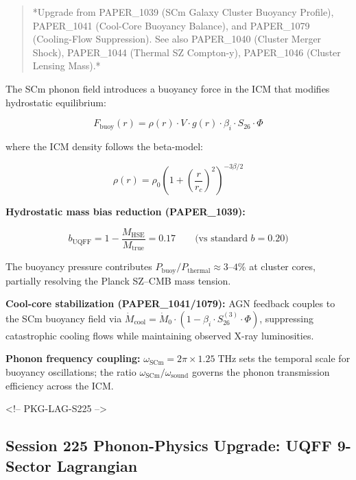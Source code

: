 \documentclass[12pt,a4paper]{article}
\begin{document}
\begin{quote}
*Upgrade from PAPER\_1039 (SCm Galaxy Cluster Buoyancy Profile),
PAPER\_1041 (Cool-Core Buoyancy Balance), and PAPER\_1079 (Cooling-Flow
Suppression).  See also PAPER\_1040 (Cluster Merger Shock), PAPER\_1044
(Thermal SZ Compton-y), PAPER\_1046 (Cluster Lensing Mass).*
\end{quote}

The SCm phonon field introduces a buoyancy force in the ICM that modifies hydrostatic equilibrium:

\begin{equation}
F_{\text{buoy}}(r) = \rho(r) \cdot V \cdot g(r) \cdot \beta_i \cdot S_{26} \cdot \Phi
\end{equation}

where the ICM density follows the beta-model:

\begin{equation}
\rho(r) = \rho_0 \left(1 + \left(\frac{r}{r_c}\right)^2\right)^{-3\beta/2}
\end{equation}

\textbf{Hydrostatic mass bias reduction (PAPER\_1039):}

\begin{equation}
b_{\text{UQFF}} = 1 - \frac{M_{\text{HSE}}}{M_{\text{true}}} = 0.17 \qquad \text{(vs standard } b = 0.20\text{)}
\end{equation}

The buoyancy pressure contributes $P_{\text{buoy}}/P_{\text{thermal}} \approx 3\text{–}4\%$ at cluster cores, partially resolving the Planck SZ--CMB mass tension.

\textbf{Cool-core stabilization (PAPER\_1041/1079):} AGN feedback couples to the SCm buoyancy field via $\dot{M}_{\text{cool}} = \dot{M}_0 \cdot (1 - \beta_i \cdot S_{26}^{(3)} \cdot \Phi)$, suppressing catastrophic cooling flows while maintaining observed X-ray luminosities.

\textbf{Phonon frequency coupling:} $\omega_{\text{SCm}} = 2\pi \times 1.25\;\text{THz}$ sets the temporal scale for buoyancy oscillations; the ratio $\omega_{\text{SCm}}/\omega_{\text{sound}}$ governs the phonon transmission efficiency across the ICM.

<!-- PKG-LAG-S225 -->

\subsection{Session 225 Phonon-Physics Upgrade: UQFF 9-Sector Lagrangian}
\end{document}
